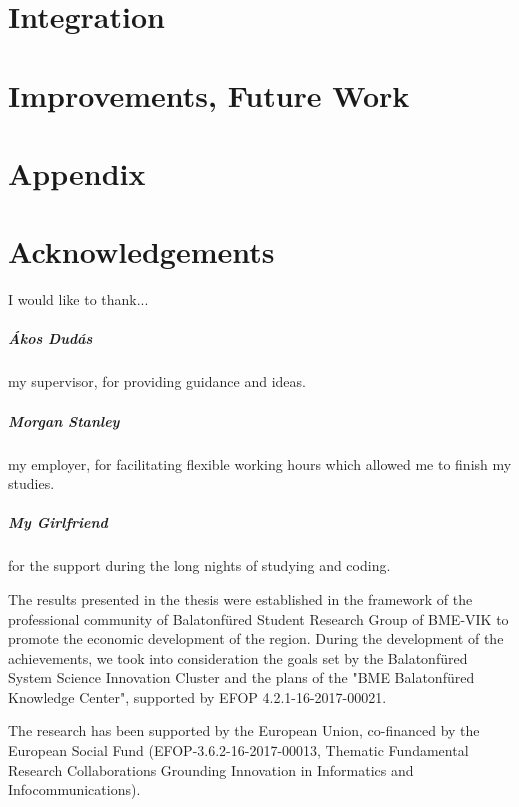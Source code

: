\documentclass[a4paper,12pt,twoside]{report}
\begin{document}
\chapter{Integration}


\chapter{Improvements, Future Work}


\appendix
\chapter{Appendix}





\chapter*{Acknowledgements}
I would like to thank...
\paragraph{Ákos Dudás} my supervisor, for providing guidance and ideas.
\paragraph{Morgan Stanley} my employer, for facilitating flexible working hours which allowed me to finish my studies.
\paragraph{My Girlfriend} for the support during the long nights of studying and coding.

\vspace{3cm}

\small
The results presented in the thesis were established in the framework of the professional community of Balatonfüred Student Research Group of BME-VIK to promote the economic  development of the region. During the development of the achievements, we took into consideration the goals set by the Balatonfüred System Science Innovation Cluster and the plans of the "BME Balatonfüred Knowledge Center", supported by EFOP 4.2.1-16-2017-00021.

The research has been supported by the European Union, co-financed by the European Social Fund (EFOP-3.6.2-16-2017-00013, Thematic Fundamental Research Collaborations Grounding Innovation in Informatics and Infocommunications).
\end{document}
